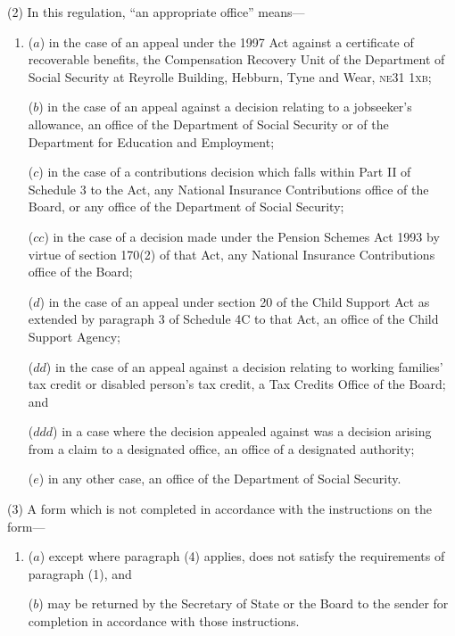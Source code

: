 \documentclass[12pt,a4paper]{article}
\begin{document}
(2) In this regulation, “an appropriate office” means—
\begin{enumerate}\item[]
($a$) in the case of an appeal under the 1997 Act against a certificate of recoverable benefits, the Compensation Recovery Unit of the Department of Social Security at Reyrolle Building, Hebburn, Tyne and Wear, \textsc{\lowercase{NE31 1XB}};

($b$) in the case of an appeal against a decision relating to a jobseeker’s allowance, an office of the Department of Social Security or of the Department for Education and Employment;

($c$) in the case of a contributions decision which falls within Part II of Schedule 3 to the Act, any National Insurance Contributions office
of the Board, or any office of the Department of Social Security;  %

($cc$) in the case of a decision made under the Pension Schemes Act 1993 by virtue of section 170(2) of that Act, any National Insurance Contributions office of the Board;

($d$) in the case of an appeal under section 20 of the Child Support Act as extended by paragraph 3 of Schedule 4C to that Act, an office of the Child Support Agency; %

($dd$) in the case of an appeal against a decision relating to working families' tax credit or disabled person’s tax credit, a Tax Credits Office of the Board; and

($ddd$) in a case where the decision appealed against was a decision arising from a claim to a designated office, an office of a designated authority;

($e$) in any other case, an office of the Department of Social Security.
\end{enumerate}

(3) A form which is not completed in accordance with the instructions on the form—
\begin{enumerate}\item[]
($a$) except where paragraph (4) applies, does not satisfy the requirements of paragraph (1), and

($b$) may be returned by the Secretary of State 
or the Board   %
to the sender for completion in accordance with those instructions.
\end{enumerate}
\end{document}
